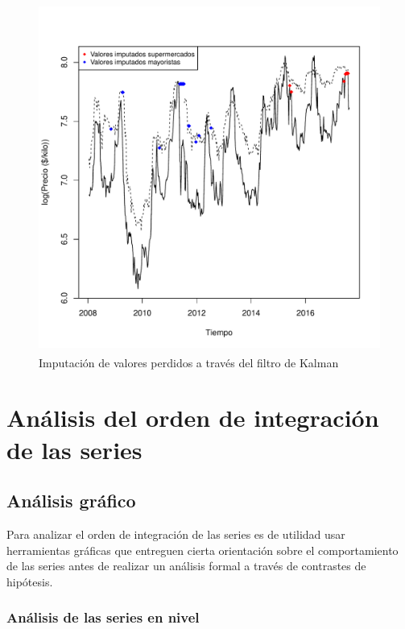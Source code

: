 \documentclass[12pt, twoside]{book}\usepackage[]{graphicx}\usepackage[]{color}
\newenvironment{knitrout}{}{} %
\numberwithin{equation}{section}
\numberwithin{theorem}{section}
\numberwithin{teorema}{section}
\numberwithin{defi}{section}
\numberwithin{prop}{section}
\numberwithin{defi}{section}
\theoremstyle{plain}
\begin{document}
\begin{knitrout}
\color{fgcolor}\begin{figure}[H]

{\centering \includegraphics[width=6.5in,height=4.5in]{figure/fig-3-1} 

}

\caption[Imputación de valores perdidos a través del filtro de Kalman]{Imputación de valores perdidos a través del filtro de Kalman}\label{fig:fig-3}
\end{figure}


\end{knitrout}

\section{Análisis del orden de integración de las series}
\subsection{Análisis gráfico}

Para analizar el orden de integración de las series es de utilidad usar herramientas gráficas que entreguen cierta orientación sobre el comportamiento de las series antes de realizar un análisis formal a través de contrastes de hipótesis. 


\subsubsection{Análisis de las series en nivel}
\end{document}
